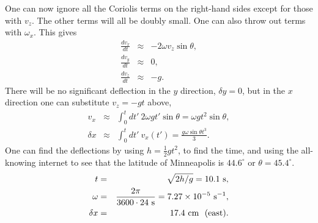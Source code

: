 One can now ignore all the Coriolis terms on the right-hand sides except for those with $v_z$. The other terms will all be doubly small. One can also throw out terms with $\omega_x$. This gives
\begin{eqnarray*}
\frac{dv_x}{dt}&\approx& -2\omega v_z\sin\theta,\\
\frac{dv_y}{dt}&\approx& 0,\\
\frac{dv_z}{dt}&\approx& -g.
\end{eqnarray*}
There will be no significant deflection in the $y$ direction, $\delta y=0$, but in the $x$ direction one can substitute $v_z=-gt$ above,
\begin{eqnarray*}
v_x&\approx&\int_0^t dt'~2\omega gt'\sin\theta=\omega gt^2\sin\theta,\\
\delta x&\approx& \int_0^t dt'~v_x(t')=\frac{g\omega\sin\theta t^3}{3}.
\end{eqnarray*}
One can find the deflections by using $h=\frac{1}{2}gt^2$, to find the time, and using the all-knowing internet to see that the latitude of Minneapolis is $44.6^\circ$ or $\theta=45.4^\circ$.
\begin{eqnarray*}
t&=&\sqrt{2h/g}=10.1~{\rm s},\\
\omega&=&\frac{2\pi}{3600\cdot 24~{\rm s}}=7.27\times 10^{-5}~{\rm s}^{-1},\\
\delta x&=&17.4~{\rm cm}~~{\rm(east)}.
\end{eqnarray*}

\exampleend



